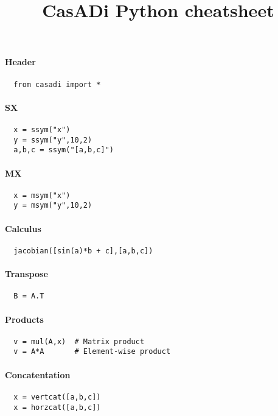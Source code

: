 \documentclass[a4paper,8pt,twocolumn]{article}
\begin{document}
\title{CasADi Python cheatsheet}
\date{}
\maketitle

\paragraph{Header}
\begin{verbatim}
  from casadi import *
\end{verbatim}

\paragraph{SX}
\begin{verbatim}
  x = ssym("x")
  y = ssym("y",10,2)
  a,b,c = ssym("[a,b,c]")
\end{verbatim}

\paragraph{MX}
\begin{verbatim}
  x = msym("x")
  y = msym("y",10,2)
\end{verbatim}

\paragraph{Calculus}
\begin{verbatim}
  jacobian([sin(a)*b + c],[a,b,c])
\end{verbatim}

\paragraph{Transpose}
\begin{verbatim}
  B = A.T
\end{verbatim}

\paragraph{Products}
\begin{verbatim}
  v = mul(A,x)  # Matrix product
  v = A*A       # Element-wise product
\end{verbatim}

\paragraph{Concatentation}
\begin{verbatim}
  x = vertcat([a,b,c])
  x = horzcat([a,b,c])
\end{verbatim}
\end{document}
